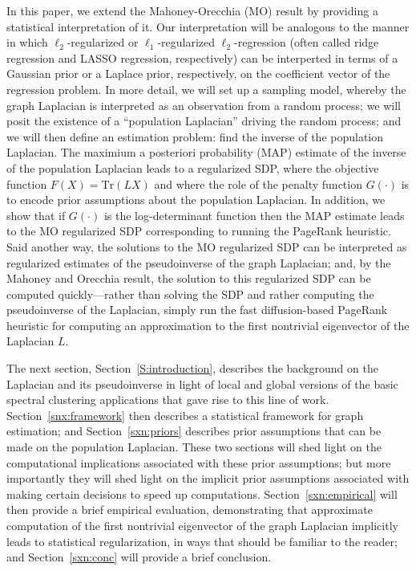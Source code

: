 \documentclass[12pt]{article}
\theoremstyle{plain}
\begin{document}
In this paper, we extend the Mahoney-Orecchia (MO) result by providing a
statistical interpretation of it.
Our interpretation will be analogous to the manner in which
$\ell_2$-regularized or $\ell_1$-regularized $\ell_2$-regression (often
called ridge regression and LASSO regression, respectively) can be
interperted in terms of a Gaussian prior or a Laplace prior, respectively,
on the coefficient vector of the regression problem.
In more detail, we will set up a sampling model, whereby the graph Laplacian
is interpreted as an observation from a random process; we will posit the
existence of a ``population Laplacian'' driving the random process; and we
will then define an estimation problem: find the inverse of the population
Laplacian.
The maximium a posteriori probability (MAP) estimate of the inverse of the
population Laplacian leads to a regularized SDP, where the objective
function $F(X)=\mathrm{Tr}(L X)$ and where the role of the penalty function
$G(\cdot)$ is to encode prior assumptions about the population Laplacian.
In addition, we show that if $G(\cdot)$ is the log-determinant function then
the MAP estimate leads to the MO regularized SDP corresponding to running
the PageRank heuristic.
Said another way, the solutions to the MO regularized SDP can be interpreted
as regularized estimates of the pseudoinverse of the graph Laplacian; and,
by the Mahoney and Orecchia result, the solution to this regularized SDP can
be computed quickly---rather than solving the SDP and rather computing the
pseudoinverse of the Laplacian, simply run the fast diffusion-based PageRank
heuristic for computing an approximation to the first nontrivial eigenvector
of the Laplacian $L$.

The next section, Section~\ref{S:introduction}, describes the background on
the Laplacian and its pseudoinverse in light of local and global versions of
the basic spectral clustering applications that gave rise to this line of
work.
Section~\ref{snx:framework} then describes a statistical framework for graph
estimation; and Section~\ref{sxn:priors} describes prior assumptions that
can be made on the population Laplacian.
These two sections will shed light on the computational implications
associated with these prior assumptions; but more importantly they will shed
light on the implicit prior assumptions associated with making certain
decisions to speed up computations.
Section~\ref{sxn:empirical} will then provide a brief empirical evaluation,
demonstrating that approximate computation of the first nontrivial
eigenvector of the graph Laplacian implicitly leads to statistical
regularization, in ways that should be familiar to the reader; and
Section~\ref{sxn:conc} will provide a brief conclusion.
\end{document}
